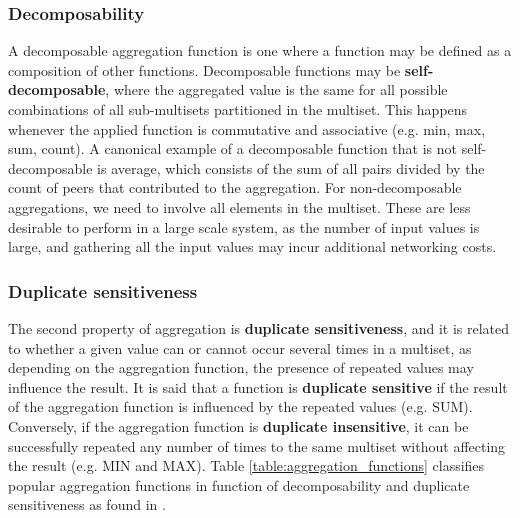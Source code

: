 \subsubsection*{Decomposability}

A decomposable aggregation function is one where a function may be defined as a composition of other functions. Decomposable functions may be \textbf{self-decomposable}, where the aggregated value is the same for all possible combinations of all sub-multisets partitioned in the multiset. This happens whenever the applied function is commutative and associative (e.g. min, max, sum, count). A canonical example of a decomposable function that is not self-decomposable is average, which consists of the sum of all pairs divided by the count of peers that contributed to the aggregation. For non-decomposable aggregations, we need to involve all elements in the multiset. These are less desirable to perform in a large scale system, as the number of input values is large, and gathering all the input values may incur additional networking costs.


\subsubsection*{Duplicate sensitiveness}

The second property of aggregation is \textbf{duplicate sensitiveness}, and it is related to whether a given value can or cannot occur several times in a multiset, as depending on the aggregation function, the presence of repeated values may influence the result. It is said that a function is \textbf{duplicate sensitive} if the result of the aggregation function is influenced by the repeated values (e.g. SUM). Conversely, if the aggregation function is \textbf{duplicate insensitive}, it can be successfully repeated any number of times to the same multiset without affecting the result (e.g. MIN and MAX). Table \ref{table:aggregation_functions} classifies popular aggregation functions in function of decomposability and duplicate sensitiveness as found in \cite{DBLP:journals/corr/abs-1110-0725}.

\begin{table}[]
    \centering
    \caption{Decomposability and duplicate sensitiveness of aggregation functions}
    \label{table:aggregation_functions}
\end{table}

